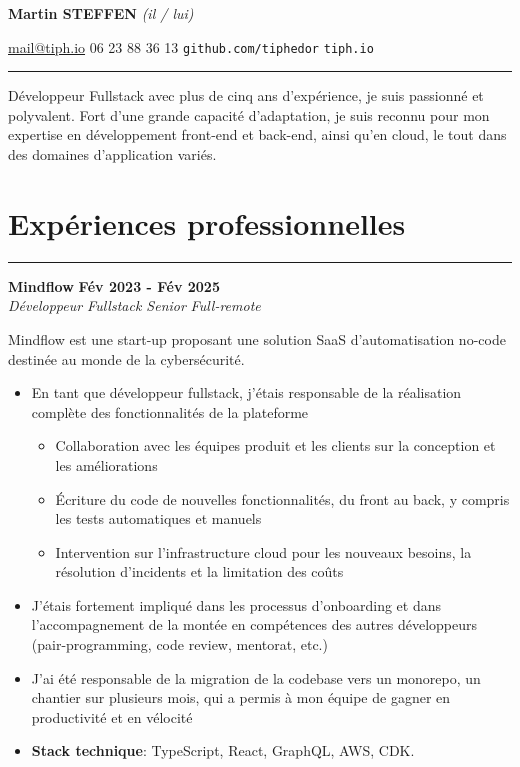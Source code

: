 \documentclass[11pt]{article}
\newcommand{\experience}[4]{%
  \vspace{5pt}
  \textbf{#2} \hfill \textbf{#3} \\
  \textit{#1} \hfill \textit{#4} \\
  \vspace{-10pt}
}
\newcommand{\cvsection}[1]{%
  \section*{#1}
    \vspace{-10pt}
    \hrule
    \vspace{10pt}
}
\begin{document}
\textbf{\Huge Martin STEFFEN} \textit{(il / lui)}

\large{\href{mailto:mail@tiph.io}{mail@tiph.io}  06 23 88 36 13  \texttt{github.com/tiphedor}  \texttt{tiph.io}}

\vspace{10pt}
\hrule
\vspace{15pt}


Développeur Fullstack avec plus de cinq ans d'expérience, je suis passionné et polyvalent. Fort d'une grande capacité d'adaptation, je suis reconnu pour mon expertise en développement front-end et back-end, ainsi qu'en cloud, le tout dans des domaines d'application variés.

\cvsection{Expériences professionnelles}

\experience{Développeur Fullstack Senior}{Mindflow}{Fév 2023 - Fév 2025}{Full-remote}


Mindflow est une start-up proposant une solution SaaS d'automatisation no-code destinée au monde de la cybersécurité.

\begin{itemize}
    \item En tant que développeur fullstack, j'étais responsable de la réalisation complète des fonctionnalités de la plateforme
    \begin{itemize}
        \item Collaboration avec les équipes produit et les clients sur la conception et les améliorations
        \item Écriture du code de nouvelles fonctionnalités, du front au back, y compris les tests automatiques et manuels
        \item Intervention sur l'infrastructure cloud pour les nouveaux besoins, la résolution d'incidents et la limitation des coûts
    \end{itemize}
    \item J'étais fortement impliqué dans les processus d'onboarding et dans l'accompagnement de la montée en compétences des autres développeurs (pair-programming, code review, mentorat, etc.)
    \item J'ai été responsable de la migration de la codebase vers un monorepo, un chantier sur plusieurs mois, qui a permis à mon équipe de gagner en productivité et en vélocité
    \item \textbf{Stack technique}: TypeScript, React, GraphQL, AWS, CDK.
\end{itemize}
\end{document}
